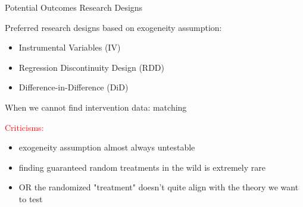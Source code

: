 \documentclass[notes,11pt, aspectratio=169, usenames, dvipsnames]{beamer}
\newenvironment{wideitemize}{\itemize\addtolength{\itemsep}{10pt}}{\enditemize}
\begin{document}
\begin{frame}{Potential Outcomes Research Designs}
	\begin{wideitemize}
		\item Preferred research designs based on exogeneity assumption:
		\begin{itemize}
			\item Instrumental Variables (IV)
			\item Regression Discontinuity Design (RDD)
			\item Difference-in-Difference (DiD)
		\end{itemize}
		\item When we cannot find intervention data: matching
		\item \textcolor{red}{Criticisms:}
		\begin{itemize}
			\item exogeneity assumption almost always untestable
			\item finding guaranteed random treatments in the wild is extremely rare
			\item OR the randomized "treatment" doesn't quite align with the theory we want to test
		\end{itemize} 
	\end{wideitemize}
\end{frame}
\end{document}

